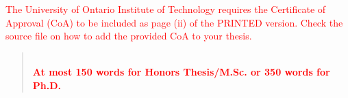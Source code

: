 \begin{preliminary}

\maketitle



% 


\cleardoublepage
{}
\noindent \textcolor{red}{The University of Ontario Institute of Technology requires the
Certificate of Approval (CoA) to be included as page (ii) of
the PRINTED version. Check the source file on how to add
the provided CoA to your thesis.}


\begin{abstract}
  \lipsum[1]\\
  \textcolor{red}{{\bf At most 150 words for Honors Thesis/M.Sc. or 350 words for Ph.D.}}
\vfill
{}
\end{abstract}





\end{preliminary}
